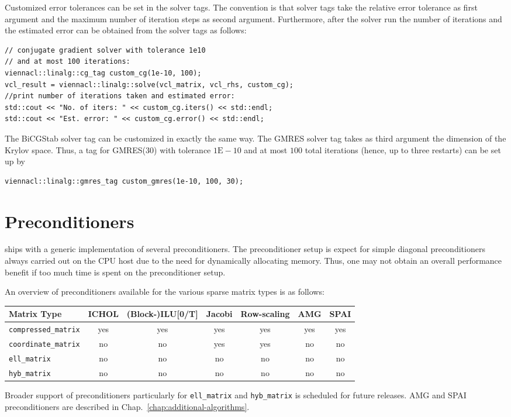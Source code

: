 Customized error tolerances can be set in the solver tags. The convention is
that solver tags take the relative error tolerance as first argument and the
maximum number of iteration steps as second argument. Furthermore, after the
solver run the number of iterations and the estimated error can be obtained from
the solver tags as follows:
\begin{lstlisting}
// conjugate gradient solver with tolerance 1e10
// and at most 100 iterations:
viennacl::linalg::cg_tag custom_cg(1e-10, 100);
vcl_result = viennacl::linalg::solve(vcl_matrix, vcl_rhs, custom_cg);
//print number of iterations taken and estimated error:
std::cout << "No. of iters: " << custom_cg.iters() << std::endl;
std::cout << "Est. error: " << custom_cg.error() << std::endl;
\end{lstlisting}
The BiCGStab solver tag can be customized in exactly the same way. The GMRES
solver tag takes as third argument the dimension of the Krylov space. Thus, a
tag for GMRES(30) with tolerance $1\mathrm{E}\!-\!10$ and at most $100$ total
iterations
(hence, up to three restarts) can be set up by 
\begin{lstlisting}
viennacl::linalg::gmres_tag custom_gmres(1e-10, 100, 30);
\end{lstlisting}

\section{Preconditioners} \label{sec:preconditioner}
{\ViennaCL} ships with a generic implementation of several preconditioners.
The preconditioner setup is expect for simple diagonal preconditioners always carried out on the CPU host due to the need for dynamically allocating memory.
Thus, one may not obtain an overall performance benefit if too much time is spent on the preconditioner setup.


An overview of preconditioners available for the various sparse matrix types is as follows:
\begin{center}
 \begin{tabular}{|l|c|c|c|c|c|c|}
  \hline
  Matrix Type & ICHOL & (Block-)ILU[0/T] & Jacobi & Row-scaling & AMG & SPAI \\
  \hline
  \lstinline|compressed_matrix| & yes & yes & yes & yes & yes & yes \\
  \lstinline|coordinate_matrix| & no & no & yes & yes & no & no \\
  \lstinline|ell_matrix| & no & no & no & no & no & no \\
  \lstinline|hyb_matrix| & no & no & no & no & no & no \\
  \hline
 \end{tabular}
\end{center}
Broader support of preconditioners particularly for \lstinline|ell_matrix| and \lstinline|hyb_matrix| is scheduled for future releases.
AMG and SPAI preconditioners are described in Chap.~\ref{chap:additional-algorithms}.


